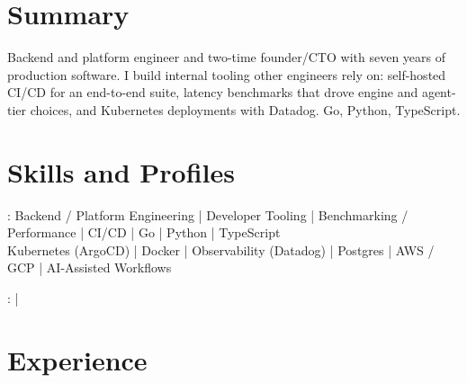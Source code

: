 \documentclass[print]{jack-resume}
\begin{document}
\pagecolor{darkmodeBackground}


\begin{minipage}[t][1cm][t]{.03\textwidth}
    \hfill
\end{minipage}

\section{Summary}
Backend and platform engineer and two-time founder/CTO with seven years of production software. I build internal tooling other engineers rely on: self-hosted CI/CD for an end-to-end suite, latency benchmarks that drove engine and agent-tier choices, and Kubernetes deployments with Datadog. Go, Python, TypeScript.
\sectionsep

\section{Skills and Profiles}
:
Backend / Platform Engineering \hfill | \hfill
Developer Tooling \hfill | \hfill
Benchmarking / Performance \hfill | \hfill
CI/CD \hfill | \hfill
Go \hfill | \hfill
Python \hfill | \hfill
TypeScript \\
\hspace{1.0cm} Kubernetes (ArgoCD) \hfill | \hfill
Docker \hfill | \hfill
Observability (Datadog) \hfill | \hfill
Postgres \hfill | \hfill
AWS / GCP \hfill | \hfill
AI-Assisted Workflows \\

\raggedright{
    :
      \href{https://www.linkedin.com/in/jack-sturtevant/}{ \ExternalLink} |
     \href{https://github.com/jacksturt}{ \ExternalLink}}

\section{Experience}
\end{document}
